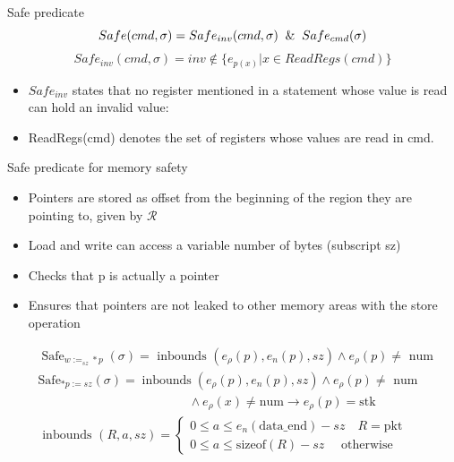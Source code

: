 \documentclass[aspectratio=169]{beamer}
\begin{document}
\begin{frame}{Safe predicate}
  $$ Safe(cmd, \sigma ) = Safe_{inv} (cmd, \sigma ) \And Safe_{cmd} (\sigma) $$
  $$Safe_{inv}(cmd, \sigma) = inv \notin \{ {e_{p(x)} | x \in ReadRegs(cmd)\}}$$
  \begin{itemize}
    \item $Safe_{inv}$ states that no register mentioned
          in a statement whose value is read can hold an invalid value:
    \item ReadRegs(cmd) denotes the set of registers whose
          values are read in cmd.
  \end{itemize}
\end{frame}

\begin{frame}{Safe predicate for memory safety}
  \begin{itemize}
    \item Pointers are stored as offset from the beginning of the region they are pointing to, given by $\mathcal{R}$
    \item Load and write can access a variable number of bytes (subscript sz)
    \item Checks that p is actually a pointer
    \item Ensures that pointers are not leaked to other memory areas with the store operation

  \end{itemize}

  $$
    \begin{aligned}     &
                   \operatorname{Safe}_{w:=_{s z} * p}(\sigma)=\text { inbounds }\left(e_\rho(p), e_n(p), s z\right) \wedge e_\rho(p) \neq \text { num }                                                                                     \\ &
                   \mathrm{Safe}_{* p:=s z}(\sigma)=\operatorname{inbounds}\left(e_\rho(p), e_n(p), s z\right) \wedge e_\rho(p) \neq \text { num }                                                                                           \\ &
                   \qquad \qquad \qquad \qquad \qquad \qquad \wedge e_\rho(x) \neq \mathrm{num} \rightarrow e_\rho(p)=\mathrm{stk}                                                                                                           \\ &
                   \text { inbounds }(R, a, s z)= \left\{\begin{array}{l}0 \leq a \leq e_{n} (\text{data\_end})-sz \quad R=\mathrm{pkt} \\ 0 \leq a \leq \text {sizeof}(R)-sz \quad \text { otherwise }\end{array}\right. \\ &
    \end{aligned}
  $$
\end{frame}
\end{document}
